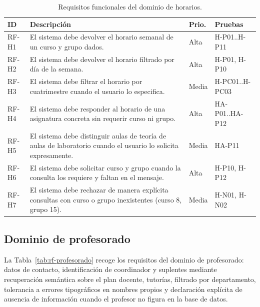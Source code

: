 \begin{table}[hbtp]
\centering
\small
\caption{Requisitos funcionales del dominio de horarios.}\label{tab:rf-horarios}
\begin{tabular}{|p{1.1cm}|p{8.2cm}|p{1.0cm}|p{2.0cm}|}
\hline
\textbf{ID} & \textbf{Descripción} & \textbf{Prio.} & \textbf{Pruebas} \\ \hline
RF-H1 & El sistema debe devolver el horario semanal de un curso y grupo dados. & Alta & H-P01..H-P11 \\ \hline
RF-H2 & El sistema debe devolver el horario filtrado por día de la semana. & Alta & H-P01, H-P10 \\ \hline
RF-H3 & El sistema debe filtrar el horario por cuatrimestre cuando el usuario lo especifica. & Media & H-PC01..H-PC03 \\ \hline
RF-H4 & El sistema debe responder al horario de una asignatura concreta sin requerir curso ni grupo. & Alta & HA-P01..HA-P12 \\ \hline
RF-H5 & El sistema debe distinguir aulas de teoría de aulas de laboratorio cuando el usuario lo solicita expresamente. & Media & HA-P11 \\ \hline
RF-H6 & El sistema debe solicitar curso y grupo cuando la consulta los requiere y faltan en el mensaje. & Alta & H-P10, H-P12 \\ \hline
RF-H7 & El sistema debe rechazar de manera explícita consultas con curso o grupo inexistentes (curso 8, grupo 15). & Media & H-N01, H-N02 \\ \hline
\end{tabular}
\end{table}

\subsection{Dominio de profesorado}\label{subsec:rf-profesorado}

La Tabla~\ref{tab:rf-profesorado} recoge los requisitos del dominio de profesorado: datos de contacto, identificación de coordinador y suplentes mediante recuperación semántica sobre el plan docente, tutorías, filtrado por departamento, tolerancia a errores tipográficos en nombres propios y declaración explícita de ausencia de información cuando el profesor no figura en la base de datos.

